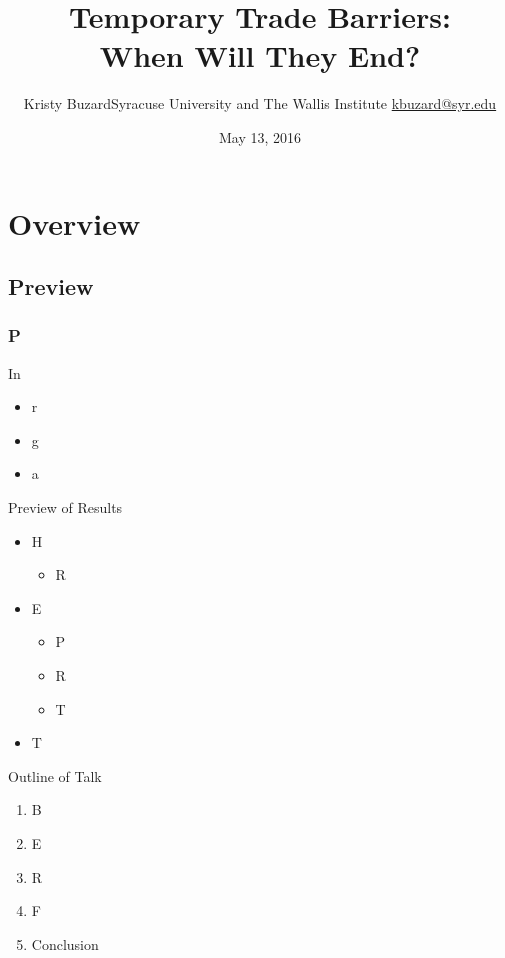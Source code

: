 \documentclass[handout]{beamer}
\title[Temporary Trade Barriers: When Will They End?\hspace{2.35in}\insertframenumber/\inserttotalframenumber]{Temporary Trade Barriers: \\ When Will They End?}
\author[Kristy Buzard]{\texorpdfstring{Kristy Buzard\newline Syracuse University and The Wallis Institute  \newline\url{kbuzard@syr.edu}}{Kristy Buzard}}
\date{May 13, 2016}
\begin{document}
\maketitle




\section{Overview}
\subsection{Preview}
\begin{frame}
\frametitle{P}
In 
\pause
\begin{itemize}[<+->]
	\item r
  \item g
	\item a
\end{itemize}
\end{frame}


\begin{frame}{Preview of Results}
\begin{itemize}[<+->]
	\item H
		\begin{itemize}
			\item R
		\end{itemize}
	\item E
		\begin{itemize}
			\item P
			\item R
			\item T
		\end{itemize}
	\item T
\end{itemize}
\end{frame}

\begin{frame}{Outline of Talk}
\begin{enumerate}[<+->]
	\item B
	\item E
	\item R
	\item F
	\item Conclusion
\end{enumerate}
\end{frame}
\end{document}

